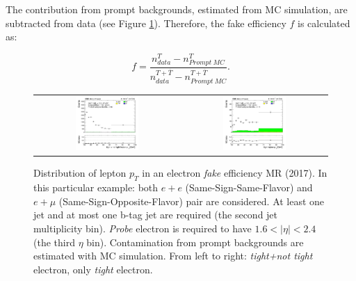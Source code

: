 The contribution from prompt backgrounds, estimated from MC simulation, are subtracted from data (see Figure \ref{fig:MRexample}). Therefore, the fake efficiency $f$ is calculated as:

\begin{equation}
f=\frac{n_{data}^{T}-n_{Prompt~MC}^{T}}{n_{data}^{T+\overline{T}}-n_{Prompt~MC}^{T+\overline{T}}}.
\label{eq:f_eq}
\end{equation}  

\begin{figure}[tbh!]
 \begin{center}
 \begin{tabular}{cc}
 \includegraphics[width=0.45\textwidth]{figures/Part3/Nonprompt/MR/FlepPt}&
 \includegraphics[width=0.45\textwidth]{figures/Part3/Nonprompt/MR/TlepPt} \\
 \end{tabular}
 \caption{Distribution of lepton $p_{T}$ in an electron \emph{fake} efficiency MR (2017). In this particular example: both $e+e$ (Same-Sign-Same-Flavor) and $e+\mu$ (Same-Sign-Opposite-Flavor) pair are considered. At least one jet and at most one b-tag jet are required (the second jet multiplicity bin). \emph{Probe} electron is required to have $1.6<|\eta|<2.4$ (the third $\eta$ bin). Contamination from prompt backgrounds are estimated with MC simulation. From left to right: \emph{tight+not tight} electron, only \emph{tight} electron.}
 \label{fig:MRexample}
 \end{center}
\end{figure}

